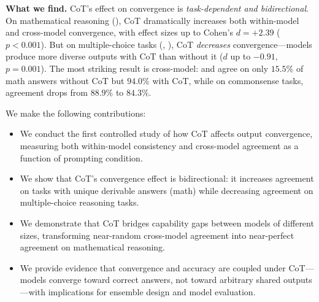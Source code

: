 {\bf What we find.} CoT's effect on convergence is \emph{task-dependent and bidirectional}. On mathematical reasoning (\gsm), CoT dramatically increases both within-model and cross-model convergence, with effect sizes up to Cohen's $d = +2.39$ ($p < 0.001$). But on multiple-choice tasks (\csqa, \arc), CoT \emph{decreases} convergence---models produce more diverse outputs with CoT than without it ($d$ up to $-0.91$, $p = 0.001$). The most striking result is cross-model: \gptmini and \gptnano agree on only $15.5\%$ of math answers without CoT but $94.0\%$ with CoT, while on commonsense tasks, agreement drops from $88.9\%$ to $84.3\%$.

We make the following contributions:
\begin{itemize}[leftmargin=*,itemsep=0pt,topsep=0pt]
    \item We conduct the first controlled study of how CoT affects output convergence, measuring both within-model consistency and cross-model agreement as a function of prompting condition.
    \item We show that CoT's convergence effect is bidirectional: it increases agreement on tasks with unique derivable answers (math) while decreasing agreement on multiple-choice reasoning tasks.
    \item We demonstrate that CoT bridges capability gaps between models of different sizes, transforming near-random cross-model agreement into near-perfect agreement on mathematical reasoning.
    \item We provide evidence that convergence and accuracy are coupled under CoT---models converge toward correct answers, not toward arbitrary shared outputs---with implications for ensemble design and model evaluation.
\end{itemize}
